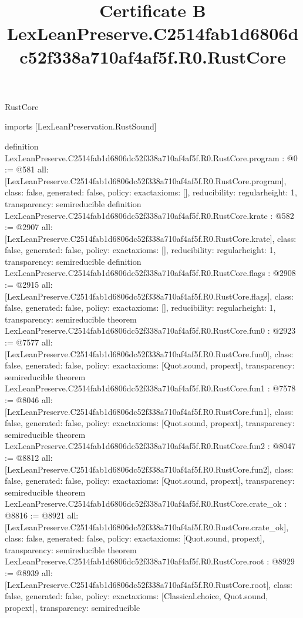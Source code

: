 \begin{lexlean}{RustCore}
\title{Certificate B LexLeanPreserve.C2514fab1d6806dc52f338a710af4af5f.R0.RustCore}
\begin{coremodule}
imports [LexLeanPreservation.RustSound]

definition LexLeanPreserve.C2514fab1d6806dc52f338a710af4af5f.R0.RustCore.program : @0 := @581 {
  all: [LexLeanPreserve.C2514fab1d6806dc52f338a710af4af5f.R0.RustCore.program],
  class: false,
  generated: false,
  policy: exact{axioms: []},
  reducibility: regular{height: 1},
  transparency: semireducible
}
definition LexLeanPreserve.C2514fab1d6806dc52f338a710af4af5f.R0.RustCore.krate : @582 := @2907 {
  all: [LexLeanPreserve.C2514fab1d6806dc52f338a710af4af5f.R0.RustCore.krate],
  class: false,
  generated: false,
  policy: exact{axioms: []},
  reducibility: regular{height: 1},
  transparency: semireducible
}
definition LexLeanPreserve.C2514fab1d6806dc52f338a710af4af5f.R0.RustCore.flags : @2908 := @2915 {
  all: [LexLeanPreserve.C2514fab1d6806dc52f338a710af4af5f.R0.RustCore.flags],
  class: false,
  generated: false,
  policy: exact{axioms: []},
  reducibility: regular{height: 1},
  transparency: semireducible
}
theorem LexLeanPreserve.C2514fab1d6806dc52f338a710af4af5f.R0.RustCore.fun0 : @2923 := @7577 {
  all: [LexLeanPreserve.C2514fab1d6806dc52f338a710af4af5f.R0.RustCore.fun0],
  class: false,
  generated: false,
  policy: exact{axioms: [Quot.sound, propext]},
  transparency: semireducible
}
theorem LexLeanPreserve.C2514fab1d6806dc52f338a710af4af5f.R0.RustCore.fun1 : @7578 := @8046 {
  all: [LexLeanPreserve.C2514fab1d6806dc52f338a710af4af5f.R0.RustCore.fun1],
  class: false,
  generated: false,
  policy: exact{axioms: [Quot.sound, propext]},
  transparency: semireducible
}
theorem LexLeanPreserve.C2514fab1d6806dc52f338a710af4af5f.R0.RustCore.fun2 : @8047 := @8812 {
  all: [LexLeanPreserve.C2514fab1d6806dc52f338a710af4af5f.R0.RustCore.fun2],
  class: false,
  generated: false,
  policy: exact{axioms: [Quot.sound, propext]},
  transparency: semireducible
}
theorem LexLeanPreserve.C2514fab1d6806dc52f338a710af4af5f.R0.RustCore.crate_ok : @8816 := @8921 {
  all: [LexLeanPreserve.C2514fab1d6806dc52f338a710af4af5f.R0.RustCore.crate_ok],
  class: false,
  generated: false,
  policy: exact{axioms: [Quot.sound, propext]},
  transparency: semireducible
}
theorem LexLeanPreserve.C2514fab1d6806dc52f338a710af4af5f.R0.RustCore.root : @8929 := @8939 {
  all: [LexLeanPreserve.C2514fab1d6806dc52f338a710af4af5f.R0.RustCore.root],
  class: false,
  generated: false,
  policy: exact{axioms: [Classical.choice, Quot.sound, propext]},
  transparency: semireducible
}


\end{coremodule}
\end{lexlean}
